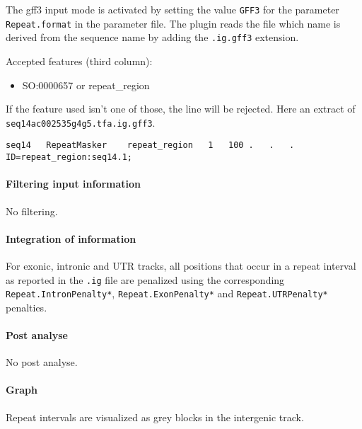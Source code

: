 The gff3 input mode is activated by setting the value \texttt{GFF3}
for the parameter \texttt{Repeat.format} in the parameter file.  The
plugin reads the file which name is derived from the sequence name by
adding the \texttt{.ig.gff3} extension.

Accepted features (third column):\\
\begin{itemize}
\item  SO:0000657 or repeat\_region
\end{itemize}
If the feature used isn't one of those, the line will be rejected. 
Here an extract of \texttt{seq14ac002535g4g5.tfa.ig.gff3}.
\begin{Verbatim}[fontsize=\tiny]
seq14	RepeatMasker	repeat_region	1	100	.	.	.	ID=repeat_region:seq14.1;
\end{Verbatim}

\paragraph{Filtering input information}

No filtering.

\paragraph{Integration of information}

For exonic, intronic and UTR tracks, all positions that occur in a
repeat interval as reported in the \texttt{.ig} file are penalized
using the corresponding \texttt{Repeat.IntronPenalty*},
\texttt{Repeat.ExonPenalty*} and \texttt{Repeat.UTRPenalty*} penalties.

\paragraph{Post analyse}

No post analyse.

\paragraph{Graph}

Repeat intervals are visualized as grey blocks in the intergenic
track.




